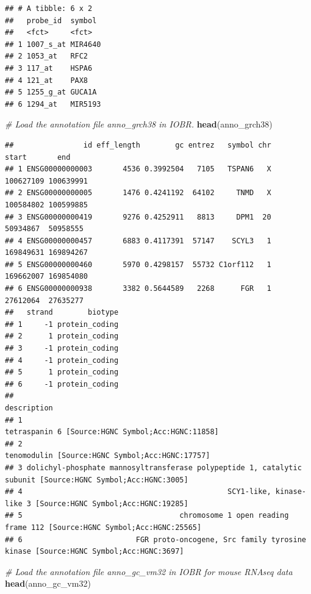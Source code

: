\documentclass[
  12pt,
]{book}
\newenvironment{Shaded}{\begin{snugshade}}{\end{snugshade}}
\newcommand{\CommentTok}[1]{\textcolor[rgb]{0.56,0.35,0.01}{\textit{#1}}}
\newcommand{\FunctionTok}[1]{\textcolor[rgb]{0.13,0.29,0.53}{\textbf{#1}}}
\newcommand{\NormalTok}[1]{#1}
\theoremstyle{definition}
\theoremstyle{definition}
\theoremstyle{definition}
\theoremstyle{definition}
\theoremstyle{remark}
\begin{document}
\begin{verbatim}
## # A tibble: 6 x 2
##   probe_id  symbol 
##   <fct>     <fct>  
## 1 1007_s_at MIR4640
## 2 1053_at   RFC2   
## 3 117_at    HSPA6  
## 4 121_at    PAX8   
## 5 1255_g_at GUCA1A 
## 6 1294_at   MIR5193
\end{verbatim}

\begin{Shaded}
\begin{Highlighting}[]
\CommentTok{\# Load the annotation file \textasciigrave{}anno\_grch38\textasciigrave{} in IOBR.}
\FunctionTok{head}\NormalTok{(anno\_grch38)}
\end{Highlighting}
\end{Shaded}

\begin{verbatim}
##                id eff_length        gc entrez   symbol chr     start       end
## 1 ENSG00000000003       4536 0.3992504   7105   TSPAN6   X 100627109 100639991
## 2 ENSG00000000005       1476 0.4241192  64102     TNMD   X 100584802 100599885
## 3 ENSG00000000419       9276 0.4252911   8813     DPM1  20  50934867  50958555
## 4 ENSG00000000457       6883 0.4117391  57147    SCYL3   1 169849631 169894267
## 5 ENSG00000000460       5970 0.4298157  55732 C1orf112   1 169662007 169854080
## 6 ENSG00000000938       3382 0.5644589   2268      FGR   1  27612064  27635277
##   strand        biotype
## 1     -1 protein_coding
## 2      1 protein_coding
## 3     -1 protein_coding
## 4     -1 protein_coding
## 5      1 protein_coding
## 6     -1 protein_coding
##                                                                                                  description
## 1                                                          tetraspanin 6 [Source:HGNC Symbol;Acc:HGNC:11858]
## 2                                                            tenomodulin [Source:HGNC Symbol;Acc:HGNC:17757]
## 3 dolichyl-phosphate mannosyltransferase polypeptide 1, catalytic subunit [Source:HGNC Symbol;Acc:HGNC:3005]
## 4                                               SCY1-like, kinase-like 3 [Source:HGNC Symbol;Acc:HGNC:19285]
## 5                                    chromosome 1 open reading frame 112 [Source:HGNC Symbol;Acc:HGNC:25565]
## 6                          FGR proto-oncogene, Src family tyrosine kinase [Source:HGNC Symbol;Acc:HGNC:3697]
\end{verbatim}

\begin{Shaded}
\begin{Highlighting}[]
\CommentTok{\# Load the annotation file \textasciigrave{}anno\_gc\_vm32\textasciigrave{} in IOBR for mouse RNAseq data}
\FunctionTok{head}\NormalTok{(anno\_gc\_vm32)}
\end{Highlighting}
\end{Shaded}
\end{document}
